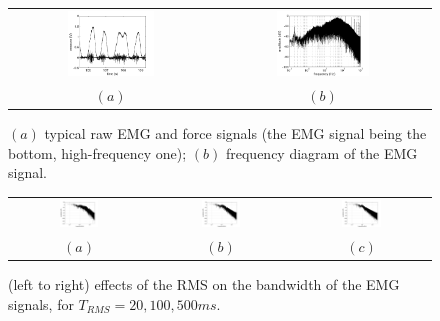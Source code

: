 \begin{figure}[!ht] \centering
  \begin{tabular}{cc}
    \includegraphics[width=0.45\textwidth]{figs/force_raw} &
    \includegraphics[width=0.45\textwidth]{figs/spectrum_raw} \\
    $(a)$ & $(b)$ \\
  \end{tabular}
  \caption{$(a)$ typical raw EMG and force signals (the EMG signal
    being the bottom, high-frequency one); $(b)$ frequency diagram of
    the EMG signal.}
  \label{fig:spectra}
\end{figure}

\begin{figure}[!ht] \centering
  \begin{tabular}{ccc}
    \includegraphics[width=0.3\textwidth]{figs/spectrum_RMS0040} &
    \includegraphics[width=0.3\textwidth]{figs/spectrum_RMS0200} &
    \includegraphics[width=0.3\textwidth]{figs/spectrum_RMS1000} \\
    $(a)$ & $(b)$ & $(c)$ \\
  \end{tabular}
  \caption{(left to right) effects of the RMS on the bandwidth of the EMG
    signals, for $T_{RMS} = 20, 100, 500ms$.}
  \label{fig:RMSs}
\end{figure}

